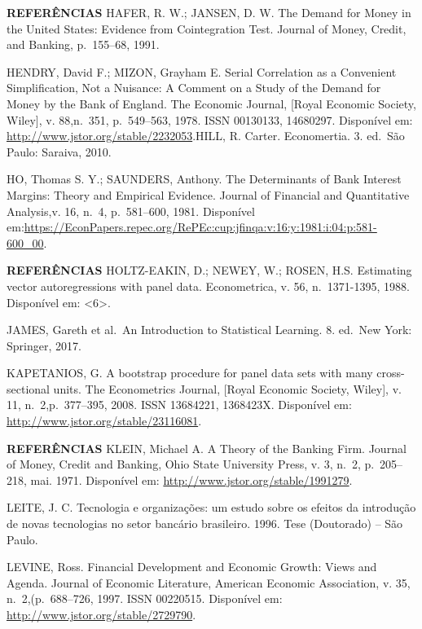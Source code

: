 \documentclass[
  ignorenonframetext,
  aspectratio=169,
  ignorenonframetext]{beamer}
\begin{document}
\begin{frame}{\textbf{REFERÊNCIAS}}
\protect\hypertarget{referuxeancias-15}{}
HAFER, R. W.; JANSEN, D. W. The Demand for Money in the United States:
Evidence from Cointegration Test. Journal of Money, Credit, and Banking,
p.~155--68, 1991.

HENDRY, David F.; MIZON, Grayham E. Serial Correlation as a Convenient
Simplification, Not a Nuisance: A Comment on a Study of the Demand for
Money by the Bank of England. The Economic Journal, {[}Royal Economic
Society, Wiley{]}, v. 88,n.~351, p.~549--563, 1978. ISSN 00130133,
14680297. Disponível em: \url{http://www.jstor.org/stable/2232053}.HILL,
R. Carter. Economertia. 3. ed.~São Paulo: Saraiva, 2010.

HO, Thomas S. Y.; SAUNDERS, Anthony. The Determinants of Bank Interest
Margins: Theory and Empirical Evidence. Journal of Financial and
Quantitative Analysis,v. 16, n.~4, p.~581--600, 1981. Disponível
em:\url{https://EconPapers.repec.org/RePEc:cup:jfinqa:v:16:y:1981:i:04:p:581-600_00}.
\end{frame}

\begin{frame}{\textbf{REFERÊNCIAS}}
\protect\hypertarget{referuxeancias-16}{}
HOLTZ-EAKIN, D.; NEWEY, W.; ROSEN, H.S. Estimating vector
autoregressions with panel data. Econometrica, v. 56, n.~1371-1395,
1988. Disponível em: \textless6\textgreater.

JAMES, Gareth et al.~An Introduction to Statistical Learning. 8. ed.~New
York: Springer, 2017.

KAPETANIOS, G. A bootstrap procedure for panel data sets with many
cross-sectional units. The Econometrics Journal, {[}Royal Economic
Society, Wiley{]}, v. 11, n.~2,p.~377--395, 2008. ISSN 13684221,
1368423X. Disponível em: \url{http://www.jstor.org/stable/23116081}.
\end{frame}

\begin{frame}{\textbf{REFERÊNCIAS}}
\protect\hypertarget{referuxeancias-17}{}
KLEIN, Michael A. A Theory of the Banking Firm. Journal of Money, Credit
and Banking, Ohio State University Press, v. 3, n.~2, p.~205--218, mai.
1971. Disponível em: \url{http://www.jstor.org/stable/1991279}.

LEITE, J. C. Tecnologia e organizações: um estudo sobre os efeitos da
introdução de novas tecnologias no setor bancário brasileiro. 1996. Tese
(Doutorado) -- São Paulo.

LEVINE, Ross. Financial Development and Economic Growth: Views and
Agenda. Journal of Economic Literature, American Economic Association,
v. 35, n.~2,(p.~688--726, 1997. ISSN 00220515. Disponível em:
\url{http://www.jstor.org/stable/2729790}.
\end{frame}
\end{document}
